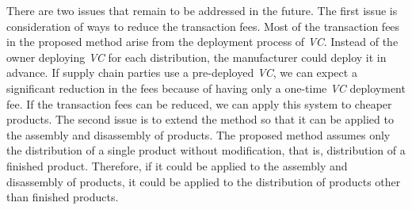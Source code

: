 \documentclass[conference]{IEEEtran}
\begin{document}
There are two issues that remain to be addressed in the future.
The first issue is consideration of ways to reduce the transaction fees.
Most of the transaction fees in the proposed method arise from the deployment process of \textit{VC}.
Instead of the owner deploying \textit{VC} for each distribution, the manufacturer could deploy it in advance.
If %
supply chain parties use a pre-deployed \textit{VC}, we can expect a significant reduction in the fees because of having only a one-time \textit{VC} deployment fee.
If the transaction fees can be reduced, we can apply this system to cheaper products.
The second issue is to extend the method so that it can be applied to the assembly and disassembly of products.
The proposed method assumes only the distribution of a single product without modification, that is, distribution of a finished product.
Therefore, if it could be applied to the assembly and disassembly of products, it could be applied to the distribution of products other than finished products.




\end{document}
